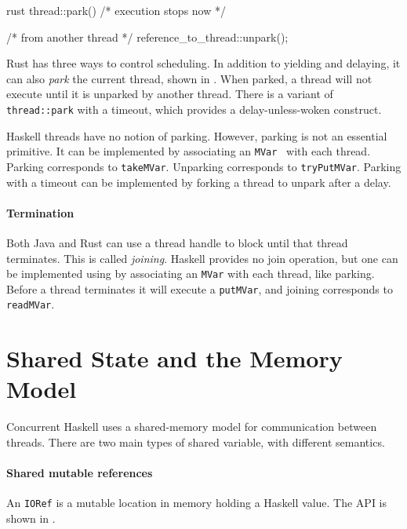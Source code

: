 \begin{listing}[h!]
\centering
\begin{cminted}{rust}
thread::park() /* execution stops now */

/* from another thread */
reference_to_thread::unpark();
\end{cminted}
\caption{Thread parking and unparking in Rust.}\label{lst:schedule_rust}
\end{listing}

Rust has three ways to control scheduling.  In addition to yielding
and delaying, it can also \emph{park} the current thread, shown in
.  When parked, a thread will not execute
until it is unparked by another thread.  There is a variant of
\verb|thread::park| with a timeout, which provides a
delay-unless-woken construct.

Haskell threads have no notion of parking.  However, parking is not an
essential primitive.  It can be implemented by associating an
\verb|MVar|~ with each thread.
Parking corresponds to \verb|takeMVar|.  Unparking corresponds to
\verb|tryPutMVar|.  Parking with a timeout can be implemented by
forking a thread to unpark after a delay.

\paragraph{Termination}
Both Java and Rust can use a thread handle to block until that thread
terminates.  This is called \emph{joining}.  Haskell provides no join
operation, but one can be implemented using by associating an
\verb|MVar| with each thread, like parking.  Before a thread
terminates it will execute a \verb|putMVar|, and joining corresponds
to \verb|readMVar|.

\section{Shared State and the Memory Model}
\label{sec:concurrent_haskell-mmodel}

Concurrent Haskell uses a shared-memory model for communication
between threads.  There are two main types of shared variable, with
different semantics.

\paragraph{Shared mutable references}
An \verb|IORef| is a mutable location in memory holding a Haskell
value.  The API is shown in .

